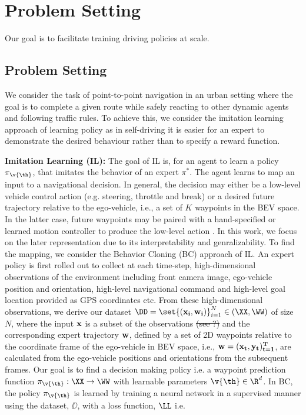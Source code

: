 \documentclass[letterpaper, 12pt]{article}
\theoremstyle{definition}
\theoremstyle{definition}
\theoremstyle{definition}
\theoremstyle{definition}
\theoremstyle{definition}
\begin{document}
\section{Problem Setting \label{org923d5fb}}
\label{sec:orgfe1d318}
Our goal is to facilitate training driving policies at scale.


\subsection{Problem Setting \label{orgd2794f0}}
\label{sec:orgb5d0477}
We consider the task of point-to-point navigation in an urban setting where
the goal is to complete a given route while safely reacting to other dynamic
agents and following traffic rules. To achieve this, we consider the imitation
learning approach of learning policy as in self-driving it is easier for an
expert to demonstrate the desired behaviour rather than to specify a reward
function.

\textbf{Imitation Learning (IL):} The goal of IL is, for an agent to learn a policy
 \(\pi_{\v{\th}}\), that imitates the behavior of an expert \(\pi^{*}\). The agent
 learns to map an input to a navigational decision. In general, the decision
 may either be a low-level vehicle control action \cite{Codevilla2019}
 (e.g. steering, throttle and break) or a desired future trajectory relative
 to the ego-vehicle, i.e., a set of \(K\) waypoints
 \cite{Chen2019,Mueller2018} in the BEV space. In the latter case, future
 waypoints may be paired with a hand-specified or learned motion controller to
 produce the low-level action \cite{Chen2019,Mueller2018}. In this work, we
 focus on the later representation due to its interpretability and
 genralizability. To find the mapping, we consider the Behavior Cloning (BC)
 approach of IL. An expert policy is first rolled out to collect at each
 time-step, high-dimensional observations of the environment including front
 camera image, ego-vehicle position and orientation, high-level navigational
 command and high-level goal location provided as GPS coordinates etc. From
 these high-dimensional observations, we derive our dataset \(\DD = \set{(\bf
   x_{i}, \bf w_{i})}_{i=1}^{N}\in(\XX,\WW)\) of size \(N\), where the input
 \(\bf x\) is a subset of the observations \sout{(see ?)} and the corresponding
 expert trajectory \(\bf w\), defined by a set of 2D waypoints relative to the
 coordinate frame of the ego-vehicle in BEV space, i.e., \(\bf
   w=(x_{t},y_{t})_{t=1}^{T}\), are calculated from the ego-vehicle positions
 and orientations from the subsequent frames. Our goal is to find a decision
 making policy i.e. a waypoint prediction function \(\pi_{\v{\th}}:\XX\to\WW\)
 with learnable parameters \(\v{\th}\in\R^{d}\). In BC, the policy
 \(\pi_{\v{\th}}\) is learned by training a neural network in a supervised
 manner using the dataset, \(\DD\), with a loss function, \(\LL\) i.e.
\end{document}
